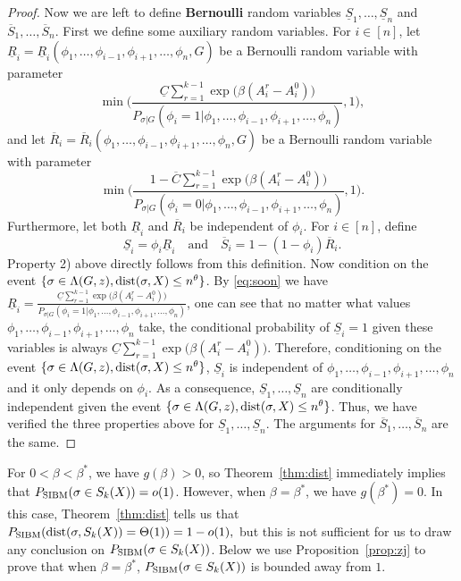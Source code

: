 \documentclass{article}
\begin{document}
\begin{proof}
	Now we are left to define {\bf Bernoulli} random variables $\underline{S}_1,\dots, \underline{S}_n$ and $\overline{S}_1,\dots,\overline{S}_n$.
	First we define some auxiliary random variables.
	For $i\in[n]$, let 
	$\underline{R}_i=\underline{R}_i(\phi_1,\dots,\phi_{i-1},\phi_{i+1},\dots,\phi_n,G)$ be a Bernoulli random variable with parameter 
	$$
	\min \Big( \frac{\underline{C}
		\sum_{r=1}^{k-1}\exp\big(\beta (A^r_i-A^0_i) \big)}{P_{\sigma|G}(\phi_i=1|\phi_1,\dots,\phi_{i-1},\phi_{i+1},\dots,\phi_n)} , 1 \Big) ,
	$$
	and let 
	$\overline{R}_i=\overline{R}_i(\phi_1,\dots,\phi_{i-1},\phi_{i+1},\dots,\phi_n,G)$ be a Bernoulli random variable with parameter 
	$$
	\min \Big(\frac{1- \overline{C}
		\sum_{r=1}^{k-1}\exp\big(\beta (A^r_i-A^0_i) \big)}{P_{\sigma|G}(\phi_i=0|\phi_1,\dots,\phi_{i-1},\phi_{i+1},\dots,\phi_n)} , 1 \Big) .
	$$
	Furthermore, let both $\underline{R}_i$ and $\overline{R}_i$ be independent of $\phi_i$.
	For $i\in[n]$, define
	$$
	\underline{S}_i=\phi_i \underline{R}_i \quad
	\text{and} \quad
	\overline{S}_i = 1- (1-\phi_i) \overline{R}_i .
	$$
	Property 2) above directly follows from this definition.
	Now condition on the event $\{\sigma\in \Lambda(G,z) ,\operatorname{dist}(\sigma, X) \le n^{\theta}\}$.
	By \eqref{eq:soon} we have $\underline{R}_i =\frac{\underline{C}
		\sum_{r=1}^{k-1}\exp\big(\beta (A^r_i-A^0_i) \big)}{P_{\sigma|G}(\phi_i=1|\phi_1,\dots,\phi_{i-1},\phi_{i+1},\dots,\phi_n)} $, one can see that no matter what values $\phi_1,\dots,\phi_{i-1},\phi_{i+1},\dots,\phi_n$ take, the conditional probability of $\underline{S}_i=1$ given these variables is always $\underline{C}
	\sum_{r=1}^{k-1}\exp\big(\beta (A^r_i-A^0_i) \big)$. Therefore, conditioning on the event $\{\sigma\in \Lambda(G,z) ,\operatorname{dist}(\sigma, X) \le n^{\theta}\}$, $\underline{S}_i$ is independent of $\phi_1,\dots,\phi_{i-1},\phi_{i+1},\dots,\phi_n$ and it only depends on $\phi_i$. As a consequence, $\underline{S}_1,\dots, \underline{S}_n$ are conditionally independent given the event $\{\sigma\in \Lambda(G,z) ,\operatorname{dist}(\sigma, X) \le n^{\theta}\}$. Thus, we have verified the three properties above for $\underline{S}_1,\dots, \underline{S}_n$. The arguments for $\overline{S}_1,\dots, \overline{S}_n$ are the same.

\end{proof}
For $0<\beta<\beta^\ast$, we have $g(\beta)>0$, so Theorem~\ref{thm:dist} immediately implies that $P_{\operatorname{SIBM}}(\sigma \in S_k(X))=o(1)$. However, when $\beta=\beta^\ast$, we have $g(\beta^\ast)=0$. In this case, Theorem~\ref{thm:dist} tells us that
$
P_{\operatorname{SIBM}}(\operatorname{dist}(\sigma, S_k(X)) = \Theta(1) ) = 1-o(1) ,
$
but this is not sufficient for us to draw any conclusion on $P_{\operatorname{SIBM}}(\sigma \in S_k(X))$.
Below we use Proposition~\ref{prop:zj} to prove that when $\beta=\beta^\ast$, $P_{\operatorname{SIBM}}(\sigma \in S_k(X))$ is bounded away from $1$.
\end{document}
